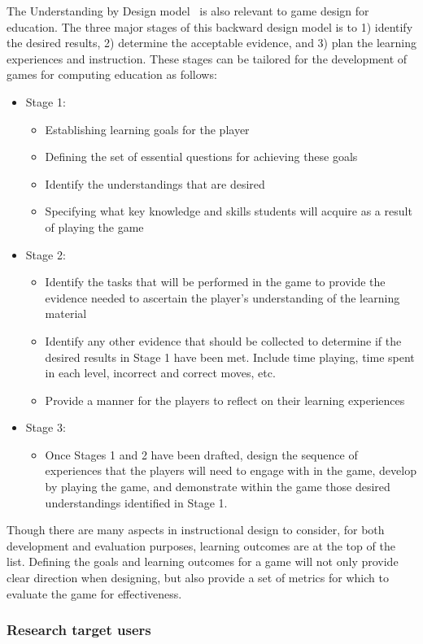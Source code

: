 \documentclass{sig-alternate-05-2015}
\begin{document}
The Understanding by Design model~\cite{wiggins05understanding} is also relevant to game design for education. The three major stages of this backward design model is to 1) identify the desired results, 2) determine the acceptable evidence, and 3) plan the learning experiences and instruction. These stages can be tailored for the development of games for computing education as follows:

\begin{itemize}
\item Stage 1:
\begin{itemize}
\item Establishing learning goals for the player 
\item Defining the set of essential questions for achieving these goals
\item Identify the understandings that are desired
\item Specifying what key knowledge and skills students will acquire as a result of playing the game
\end{itemize}
\item Stage 2: 
\begin{itemize}
\item Identify the tasks that will be performed in the game to provide the evidence needed to ascertain the player's understanding of the learning material
\item Identify any other evidence that should be collected to determine if the desired results in Stage 1 have been met. Include time playing, time spent in each level, incorrect and correct moves, etc. 
\item Provide a manner for the players to reflect on their learning experiences
\end{itemize}
\item Stage 3:
\begin{itemize}
\item Once Stages 1 and 2 have been drafted, design the sequence of experiences that the players will need to engage with in the game, develop by playing the game, and demonstrate within the game those desired understandings identified in Stage 1. 
\end{itemize}
\end{itemize}




Though there are many aspects in instructional design to consider, for both development and evaluation purposes, learning outcomes are at the top of the list. Defining the goals and learning outcomes for a game will not only provide clear direction when designing, but also provide a set of metrics for which to evaluate the game for effectiveness. \subsubsection{Research target users}
\end{document}
